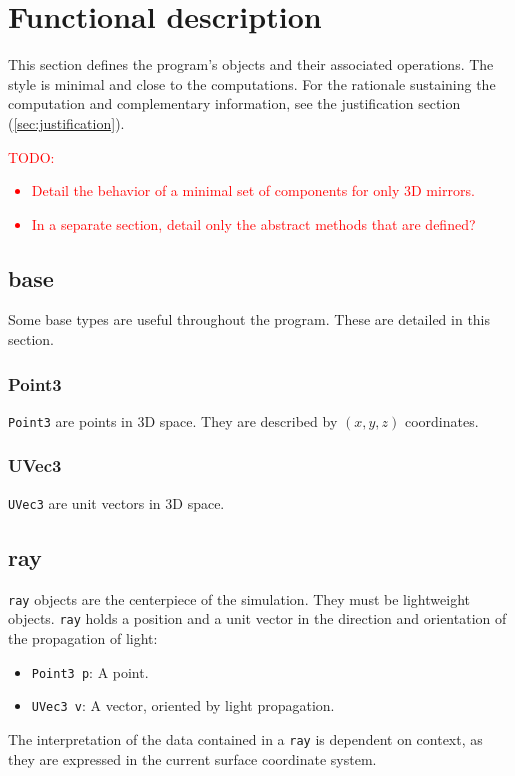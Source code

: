 \section{Functional description}
This section defines the program's objects and their associated
operations. The style is minimal and close to the computations. For
the rationale sustaining the computation and complementary information,
see the justification section (\cref{sec:justification}).

\textcolor{red}{TODO: \begin{itemize}
\item Detail the behavior of a minimal set of components for
      only 3D mirrors.
\item In a separate section, detail only the abstract methods that
      are defined?
\end{itemize}}

\subsection{base}
Some base types are useful throughout the program. These are detailed in this
section.

\subsubsection{Point3}
\lstinline{Point3} are points in 3D space. They are described by $(x, y, z)$
coordinates.

\subsubsection{UVec3}
\lstinline{UVec3} are unit vectors in 3D space.

\subsection{ray}
\lstinline{ray} objects are the centerpiece of the simulation. They must be
lightweight objects.  \lstinline{ray} holds a position and a unit vector in the
direction and orientation of the propagation of light:

\begin{itemize}
\item \lstinline{Point3 p}: A point.
\item \lstinline{UVec3 v}: A vector, oriented by light propagation.
\end{itemize}

The interpretation of the data contained in a \lstinline{ray} is dependent
on context, as they are expressed in the current surface coordinate system.

